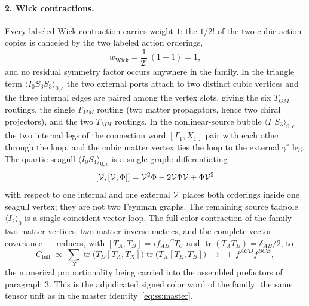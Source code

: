 \paragraph{2. Wick contractions.} Every labeled Wick contraction carries weight $1$: the $1/2!$ of the two cubic action
copies is canceled by the two labeled action orderings,
\begin{equation}\label{eq:bg:wick}
w_{\mathrm{Wick}}=\frac{1}{2!}\,(1+1)=1 ,
\end{equation}
and no residual symmetry factor occurs anywhere in the family. In the triangle term $\langle
I_{0}S_{3}S_{3}\rangle_{0,c}$ the two external ports attach to two distinct cubic vertices and the three internal
edges are paired among the vertex slots, giving the six $T_{GM}$ routings, the single $T_{MM}$ routing (two matter
propagators, hence two chiral projectors), and the two $T_{MH}$ routings. In the nonlinear-source bubble $\langle
I_{1}S_{3}\rangle_{0,c}$ the two internal legs of the connection word $[\Gamma_{1},X_{1}]$ pair with each other
through the loop, and the cubic matter vertex ties the loop to the external $\gamma^{r}$ leg. The quartic seagull
$\langle I_{0}S_{4}\rangle_{0,c}$ is a single graph: differentiating
\begin{equation}\label{eq:bg:seagull}
[\mathcal{V},[\mathcal{V},\Phi]]=\mathcal{V}^{2}\Phi-2\mathcal{V}\Phi\mathcal{V}+\Phi\mathcal{V}^{2}
\end{equation}
with respect to one internal and one external $\mathcal{V}$ places both orderings inside one seagull vertex; they are not
two Feynman graphs. The remaining source tadpole $\langle I_{2}\rangle_{0}$ is a single coincident vector loop. The
full color contraction of the family --- two matter vertices, two matter inverse metrics, and the complete vector
covariance --- reduces, with $[T_{A},T_{B}]=if_{AB}{}^{C}T_{C}$ and $\operatorname{tr}(T_{A}T_{B})=\delta_{AB}/2$,
to
\begin{equation}\label{eq:bg:color}
C_{\mathrm{full}} \;\propto\; \sum_{X}\operatorname{tr}\big(T_{D}[T_{A},T_{X}]\big) \operatorname{tr}\big(T_{X}[T_{E},T_{B}]\big) \;\longrightarrow\; +\,f^{ACD}f^{BCE} ,
\end{equation}
the numerical proportionality being carried into the assembled prefactors of paragraph 3. This is the adjudicated
signed color word of the family: the same tensor unit as in the master identity~\eqref{eq:ss:master}.


